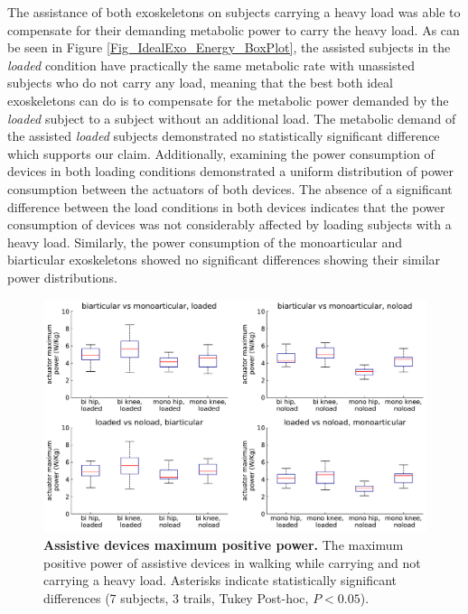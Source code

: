 \documentclass[10pt,letterpaper]{article}
\begin{document}
The assistance of both exoskeletons on subjects carrying a heavy load was able to compensate for their demanding metabolic power to carry the heavy load. As can be seen in Figure \ref{Fig_IdealExo_Energy_BoxPlot}, the assisted subjects in the \textit{loaded} condition have practically the same metabolic rate with unassisted subjects who do not carry any load, meaning that the best both ideal exoskeletons can do is to compensate for the metabolic power demanded by the \textit{loaded} subject to a subject without an additional load. The metabolic demand of the assisted \textit{loaded} subjects demonstrated no statistically significant difference which supports our claim. Additionally, examining the power consumption of devices in both loading conditions demonstrated a uniform distribution of power consumption between the actuators of both devices. The absence of a significant difference between the load conditions in both devices indicates that the power consumption of devices was not considerably affected by loading subjects with a heavy load. Similarly, the power consumption of the monoarticular and biarticular exoskeletons showed no significant differences showing their similar power distributions.\\
\begin{figure}[ht]   
	\centering
	\includegraphics[width=\linewidth]{Ideal_Exo_MonovsBi_Figures/PaperFigure_MaxPower_BoxPlot.pdf}
	\vspace{1mm}
	\caption{\small{\textbf{Assistive devices maximum positive power.} The maximum positive power of assistive devices in walking while carrying and not carrying a heavy load. Asterisks indicate statistically significant differences (7 subjects, 3 trails, Tukey Post-hoc, $P < 0.05$).}}
	\label{Fig_IdealExo_MaxPower_BoxPlot}
\end{figure}
\end{document}
